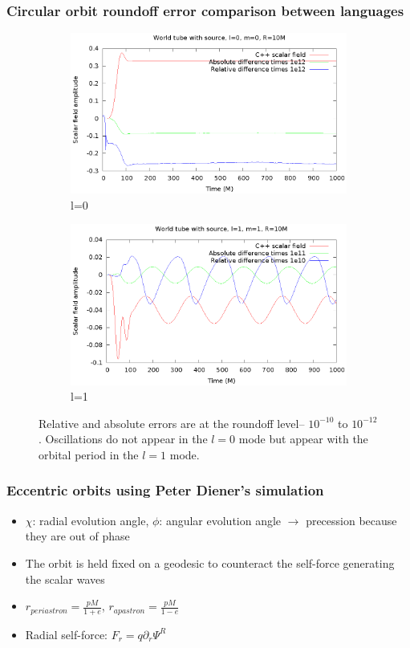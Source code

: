 \documentclass{beamer}
\begin{document}
\begin{frame}
  \frametitle{Circular orbit roundoff error comparison between languages}
  \begin{figure}
    \centering
    \begin{subfigure}{.45\textwidth}
      \centering
      \includegraphics[width=\textwidth]{wtcircl0m0}
      \caption{l=0}
   \end{subfigure}
    \begin{subfigure}{.45\textwidth}
      \centering
      \includegraphics[width=\textwidth]{wtcircl1m1}
      \caption{l=1}
    \end{subfigure}
  \caption{Relative and absolute errors are at the roundoff level-- $10^{-10}$ to $10^{-12}$. Oscillations do not appear in the $l=0$ mode but appear with the orbital period in the $l=1$ mode.}
  \end{figure}
\end{frame}


\begin{frame}
  \frametitle{Eccentric orbits using Peter Diener's simulation}
  \begin{itemize}
  \item $\chi$: radial evolution angle, $\phi$: angular evolution angle $\rightarrow$ precession because they are out of phase
  \item The orbit is held fixed on a geodesic to counteract the self-force generating the scalar waves
  \item $r_{periastron}=\frac{pM}{1+e}$, $r_{apastron}=\frac{pM}{1-e}$
  \item Radial self-force: $F_r=q\partial_r\Psi^R$
  \end{itemize}
\end{frame}
\end{document}
